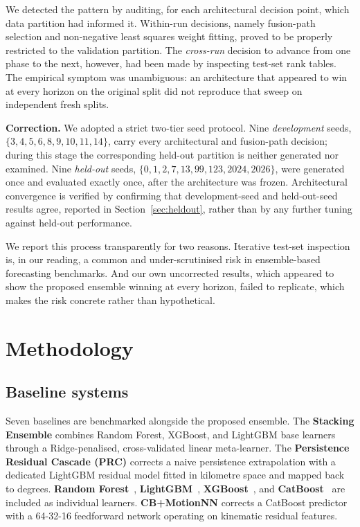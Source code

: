 \documentclass{ametsocv6.1}
\begin{document}
We detected the pattern by auditing, for each architectural decision point, which
data partition had informed it. Within-run decisions, namely fusion-path
selection and non-negative least squares weight fitting, proved to be properly
restricted to the validation partition. The \emph{cross-run} decision to advance
from one phase to the next, however, had been made by inspecting test-set rank
tables. The empirical symptom was unambiguous: an architecture that appeared to
win at every horizon on the original split did not reproduce that sweep on
independent fresh splits.

\textbf{Correction.} We adopted a strict two-tier seed protocol. Nine
\emph{development} seeds, $\{3,4,5,6,8,9,10,11,14\}$, carry every architectural and
fusion-path decision; during this stage the corresponding held-out partition is
neither generated nor examined. Nine \emph{held-out} seeds,
$\{0,1,2,7,13,99,123,2024,2026\}$, were generated once and evaluated exactly once,
after the architecture was frozen. Architectural convergence is verified by
confirming that development-seed and held-out-seed results agree, reported in
Section~\ref{sec:heldout}, rather than by any further tuning against held-out
performance.

We report this process transparently for two reasons. Iterative test-set
inspection is, in our reading, a common and under-scrutinised risk in
ensemble-based forecasting benchmarks. And our own uncorrected results, which
appeared to show the proposed ensemble winning at every horizon, failed to
replicate, which makes the risk concrete rather than hypothetical.

\section{Methodology}
\label{sec:methods}


\subsection{Baseline systems}
Seven baselines are benchmarked alongside the proposed ensemble. The
\textbf{Stacking Ensemble} combines Random Forest, XGBoost, and LightGBM base
learners through a Ridge-penalised, cross-validated linear meta-learner. The
\textbf{Persistence Residual Cascade (PRC)} corrects a naive persistence
extrapolation with a dedicated LightGBM residual model fitted in kilometre space
and mapped back to degrees. \textbf{Random Forest}~\citep{breiman2001rf},
\textbf{LightGBM}~\citep{ke2017lightgbm}, \textbf{XGBoost}~\citep{chen2016xgboost},
and \textbf{CatBoost}~\citep{prokhorenkova2018catboost} are included as individual
learners. \textbf{CB+MotionNN} corrects a CatBoost predictor with a 64-32-16
feedforward network operating on kinematic residual features.
\end{document}
